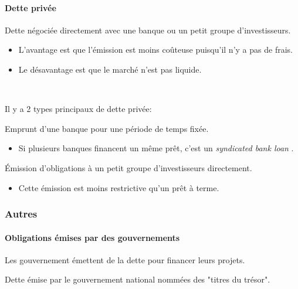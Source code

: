\documentclass[10pt, french]{article}
\begin{document}
\begin{multicols*}{2}
\paragraph{Dette privée}	Dette négociée directement avec une banque ou un petit groupe d'investisseurs.
\begin{itemize}
	\item	L'avantage est que l'émission est moins coûteuse puisqu'il n'y a pas de frais.
	\item	Le désavantage est que le marché n'est pas liquide.
\end{itemize}

\

Il y a 2 types principaux de dette privée: 

\begin{definitionNOHFILLpropos}
Emprunt d'une banque pour une période de temps fixée.
\begin{itemize}
	\item	Si plusieurs banques financent un même prêt, c'est un \og \textit{syndicated bank loan} \fg{}.
\end{itemize}
\end{definitionNOHFILLpropos}

\begin{definitionNOHFILLpropos}
Émission d'obligations à un petit groupe d'investisseurs directement.
\begin{itemize}
	\item	Cette émission est moins restrictive qu'un prêt à terme.
\end{itemize}
\end{definitionNOHFILLpropos}


\subsubsection{Autres}
\paragraph{Obligations émises par des gouvernements}	Les gouvernement émettent de la dette pour financer leurs projets.

\begin{definitionNOHFILLprop}
Dette émise par le gouvernement national nommées des "titres du trésor".\\


\end{definitionNOHFILLprop}
\end{multicols*}
\end{document}
